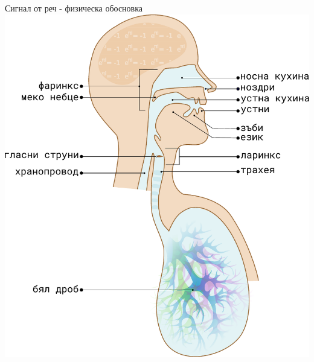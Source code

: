 \documentclass[9pt]{beamer}
\begin{document}
    \begin{frame}{Сигнал от реч - физическа обосновка}
        \includegraphics[width=0.48\paperwidth]{physics}%
        \hfill

\end{frame}
\end{document}
